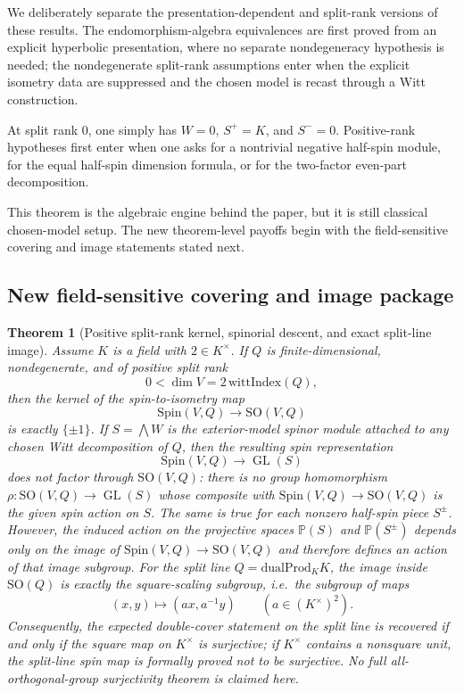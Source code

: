 \documentclass{birkjour}
\theoremstyle{plain}
\newtheorem{theorem}{Theorem}[section]
\theoremstyle{definition}
\theoremstyle{remark}
\newcommand{\Spin}{\mathrm{Spin}}
\newcommand{\SO}{\mathrm{SO}}
\newcommand{\dualProd}{\mathrm{dualProd}}
\begin{document}
We deliberately separate the presentation-dependent and split-rank
versions of these results. The endomorphism-algebra equivalences are
first proved from an explicit hyperbolic presentation, where no separate
nondegeneracy hypothesis is needed; the nondegenerate split-rank assumptions
enter when the explicit isometry data are suppressed and the chosen model is
recast through a Witt construction.

At split rank $0$, one simply has $W=0$, $S^+=K$, and $S^-=0$. Positive-rank
hypotheses first enter when one asks for a nontrivial negative half-spin module,
for the equal half-spin dimension formula, or for the two-factor even-part
decomposition.

This theorem is the algebraic engine behind the paper, but it is still
classical chosen-model setup. The new theorem-level payoffs begin with the
field-sensitive covering and image statements stated next.

\subsection*{New field-sensitive covering and image package}

\begin{theorem}[Positive split-rank kernel, spinorial descent, and exact split-line image]
\label{thm:kernel-nonfactor-split-line}
Assume $K$ is a field with $2\in K^\times$. If $Q$ is finite-dimensional,
nondegenerate, and of positive split rank
\[
  0<\dim V = 2\,\mathrm{wittIndex}(Q),
\]
then the kernel of the spin-to-isometry map
\[
  \Spin(V,Q) \to \SO(V,Q)
\]
is exactly $\{\pm1\}$. If $S=\bigwedge W$ is the exterior-model spinor module
attached to any chosen Witt decomposition of $Q$, then the resulting spin
representation
\[
  \Spin(V,Q) \to \operatorname{GL}(S)
\]
does not factor through $\SO(V,Q)$: there is no group homomorphism
$\rho:\SO(V,Q)\to \operatorname{GL}(S)$ whose composite with
$\Spin(V,Q)\to\SO(V,Q)$ is the given spin action on $S$. The same is true for
each nonzero half-spin piece $S^\pm$. However, the induced action on the
projective spaces $\mathbb{P}(S)$ and $\mathbb{P}(S^\pm)$ depends only on the
image of $\Spin(V,Q)\to\SO(V,Q)$ and therefore defines an action of that image
subgroup. For the split line $Q=\dualProd_K K$, the image inside $\SO(Q)$ is
exactly the square-scaling subgroup, i.e.\ the subgroup of maps
\[
  (x,y)\longmapsto (a x, a^{-1} y)
  \qquad (a\in (K^\times)^2).
\]
Consequently, the expected double-cover statement on the split line is recovered
if and only if the square map on $K^\times$ is surjective; if $K^\times$
contains a nonsquare unit, the split-line spin map is formally proved not to be
surjective. No full all-orthogonal-group surjectivity theorem is claimed here.
\end{theorem}
\end{document}
